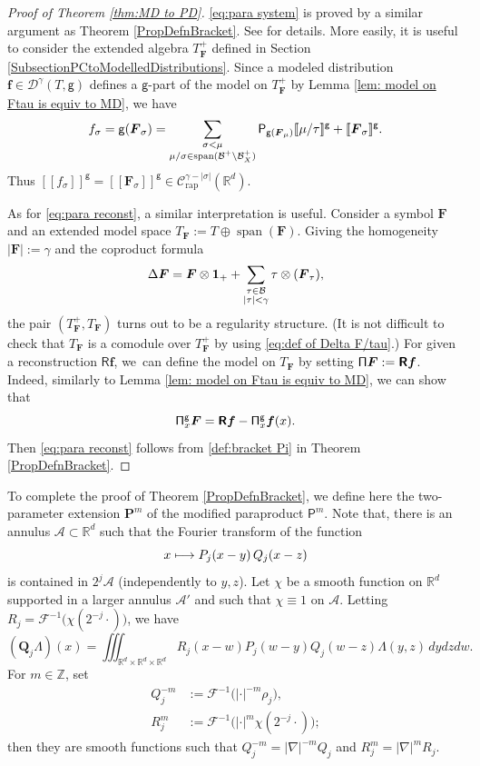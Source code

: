 \documentclass[10pt]{amsart}
\newcommand\mto{\mathchoice{\longmapsto}{\mapsto}{\mapsto}{\mapsto}}
\DeclareMathOperator{\Span}{span}
\theoremstyle{plain}
\theoremstyle{definition}
\newcommand{\Brac}[1]{[\![#1]\!]}
\newcommand{\bsf}{\boldsymbol{f}}
\newcommand{\rap}{\mathrm{rap}}
\newcommand{\bfP}{\mathbf{P}}
\newcommand{\bfQ}{\mathbf{Q}}
\newcommand{\reR}{\boldsymbol{\mathsf{R}}}
\newcommand{\sfP}{\mathsf{P}}
\newcommand{\sfg}{\mathsf{g}}
\newcommand{\bsF}{\boldsymbol{F}}
\newcommand{\bbR}{\mathbb{R}}
\newcommand{\bbZ}{\mathbb{Z}}
\newcommand{\mcA}{\mathcal{A}}
\newcommand{\mcB}{\mathcal{B}}
\newcommand{\mcC}{\mathcal{C}}
\newcommand{\mcD}{\mathcal{D}}
\newcommand{\mcF}{\mathcal{F}}
\begin{document}
\begin{proof}[Proof of Theorem \ref{thm:MD to PD}]
\eqref{eq:para system} is proved by a similar argument as Theorem \ref{PropDefnBracket}.
See \cite[Th.\,14]{BH} for details.
More easily, it is useful to consider the extended algebra $T_{\bsF}^+$ defined in Section \ref{SubsectionPCtoModelledDistributions}.
Since a modeled distribution $\bsf\in\mcD^\gamma(T,\sfg)$ defines a $\sfg$-part of the model on $T_{\bsF}^+$ by Lemma \ref{lem: model on Ftau is equiv to MD}, we have
\[
f_\sigma=\sfg(\bsF_\sigma)=\sum_{\substack{\sigma<\mu \\ \mu/\sigma\in\Span (\mcB^+\setminus\mcB_X^+)}}{\sf P}_{\sfg(\bsF_\mu)}\Brac{\mu/\tau}^{\sfg}+\Brac{\bsF_\sigma}^{\sfg}.
\]
Thus $\Brac{f_\sigma}^{\sfg}=\Brac{\bsF_\sigma}^{\sfg}\in\mcC_{\rap}^{\gamma-|\sigma|}(\bbR^d)$.

As for \eqref{eq:para reconst}, a similar interpretation is useful. Consider a symbol $\bsF$ and an extended model space $T_{\bsF}:=T\oplus\Span (\bsF)$. Giving the homogeneity $|\bsF|:=\gamma$ and the coproduct formula
\[
\Delta\bsF=\bsF\otimes{\bf1}_++\sum_{\substack{\tau\in\mcB\\|\tau|<\gamma}}\tau\otimes(\bsF_\tau),
\]
the pair $(T_{\bsF}^+,T_{\bsF})$ turns out to be a regularity structure. (It is not difficult to check that $T_{\bsF}$ is a comodule over $T_{\bsF}^+$ by using \eqref{eq:def of Delta F/tau}.)
For given a reconstruction $\reR\bsf$, we~can define the model on $T_{\bsF}$ by setting ${\sf\Pi}\bsF:=\reR\bsf$. Indeed, similarly to Lemma \ref{lem: model on Ftau is equiv to MD}, we can show that
\[
{\sf\Pi}_x^{\sfg}\bsF=\reR\bsf-{\sf\Pi}_x^{\sfg}\bsf(x).
\]
Then \eqref{eq:para reconst} follows from \eqref{def:bracket Pi} in Theorem \ref{PropDefnBracket}.
\end{proof}

To complete the proof of Theorem \ref{PropDefnBracket}, we define here the two-parameter extension $\bfP^m$ of the modified paraproduct $\sfP^m$. Note that, there is an annulus $\mcA\subset\bbR^d$ such that the Fourier transform of the function
\[
x\mto P_j(x-y)\,Q_j(x-z)
\]
is contained in $2^j\mcA$ (independently to $y,z$). Let $\chi$ be a smooth function on $\bbR^d$ supported in a larger annulus $\mcA'$ and such that $\chi\equiv1$ on $\mcA$. Letting $R_j=\mcF^{-1}\bigl(\chi(2^{-j}\cdot)\bigr)$, we have
\[
(\bfQ_j \Lambda)(x)=\iiint_{\bbR^d\times\bbR^d\times\bbR^d} R_j(x-w)P_j(w-y)Q_j(w-z) \Lambda(y,z)\,dydzdw.
\]
For $m\in\bbZ$, set
\begin{equation*} \begin{split}
Q_j^{-m} &:= \mcF^{-1}\bigl(|{\cdot}|^{-m}\rho_j\bigr), \\
R_j^m &:= \mcF^{-1}\bigl(|{\cdot}|^m\chi(2^{-j}\cdot)\bigr);
\end{split} \end{equation*}
then they are smooth functions such that $Q_j^{-m} = |\nabla|^{-m}Q_j$ and $R_j^m = |\nabla|^m R_j$.
\end{document}
